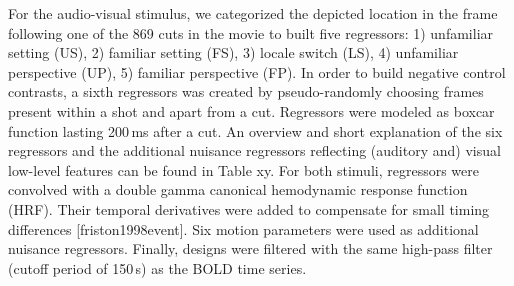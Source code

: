 \documentclass[english]{article}
\begin{document}
For the audio-visual stimulus, we categorized the depicted location in the frame following one of the 869 cuts in the movie to built five regressors: 1) unfamiliar setting (US), 2) familiar setting (FS), 3) locale switch (LS), 4) unfamiliar perspective (UP), 5) familiar perspective (FP). In order to build negative control contrasts, a sixth regressors was created by pseudo-randomly choosing frames present within a shot and apart from a cut. Regressors were modeled as boxcar function lasting 200\,ms after a cut. An overview and short explanation of the six regressors and the additional nuisance regressors reflecting (auditory and) visual low-level features can be found in Table xy. 
For both stimuli, regressors were convolved with a double gamma canonical hemodynamic response function (HRF). Their temporal derivatives were added to compensate for small timing differences [friston1998event]. Six motion parameters were used as additional nuisance regressors. Finally, designs were filtered with the same high-pass filter (cutoff period of 150\,s) as the BOLD time series.
\end{document}
